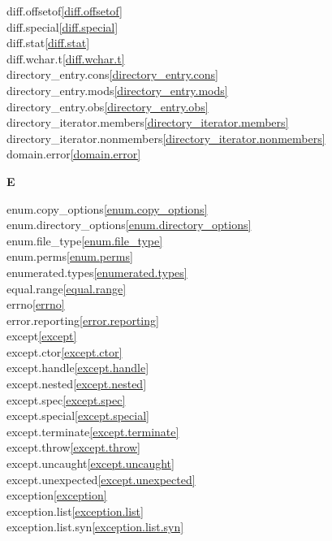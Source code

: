 \begin{multicols}{2}
diff.offsetof\quad\ref{diff.offsetof}\\
diff.special\quad\ref{diff.special}\\
diff.stat\quad\ref{diff.stat}\\
diff.wchar.t\quad\ref{diff.wchar.t}\\
directory_entry.cons\quad\ref{directory_entry.cons}\\
directory_entry.mods\quad\ref{directory_entry.mods}\\
directory_entry.obs\quad\ref{directory_entry.obs}\\
directory_iterator.members\quad\ref{directory_iterator.members}\\
directory_iterator.nonmembers\quad\ref{directory_iterator.nonmembers}\\
domain.error\quad\ref{domain.error}\\
\par \textbf{E}\par
enum.copy_options\quad\ref{enum.copy_options}\\
enum.directory_options\quad\ref{enum.directory_options}\\
enum.file_type\quad\ref{enum.file_type}\\
enum.perms\quad\ref{enum.perms}\\
enumerated.types\quad\ref{enumerated.types}\\
equal.range\quad\ref{equal.range}\\
errno\quad\ref{errno}\\
error.reporting\quad\ref{error.reporting}\\
except\quad\ref{except}\\
except.ctor\quad\ref{except.ctor}\\
except.handle\quad\ref{except.handle}\\
except.nested\quad\ref{except.nested}\\
except.spec\quad\ref{except.spec}\\
except.special\quad\ref{except.special}\\
except.terminate\quad\ref{except.terminate}\\
except.throw\quad\ref{except.throw}\\
except.uncaught\quad\ref{except.uncaught}\\
except.unexpected\quad\ref{except.unexpected}\\
exception\quad\ref{exception}\\
exception.list\quad\ref{exception.list}\\
exception.list.syn\quad\ref{exception.list.syn}\\

\end{multicols}
